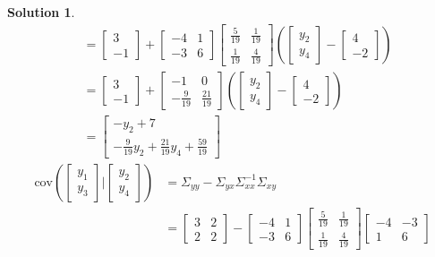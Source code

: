 \documentclass[11pt]{article}
\newtheorem{sol}{Solution}
\begin{document}
\begin{sol}
\begin{align*}
		&= \left[\begin{array}{c} 3\\ -1\end{array}\right] + \left[\begin{array}{cc} -4& 1\\ -3&6 \end{array}\right]\left[\begin{array}{cc}\frac{5}{19} & \frac{1}{19}\\ \frac{1}{19}& \frac{4}{19}\end{array}\right](\left[\begin{array}{c} y_2\\ y_4\end{array}\right] - \left[\begin{array}{c} 4\\ -2\end{array}\right])\\
		&= \left[\begin{array}{c} 3\\ -1\end{array}\right] + \left[\begin{array}{cc}-1&0 \\ -\frac{9}{19}&\frac{21}{19}  \end{array}\right](\left[\begin{array}{c} y_2\\ y_4\end{array}\right] - \left[\begin{array}{c} 4\\ -2\end{array}\right])\\
		&= \left[\begin{array}{c} -y_2 + 7\\ -\frac{9}{19}y_2 + \frac{21}{19}y_4 + \frac{59}{19}\end{array}\right]
	\end{align*}	
	\begin{align*}
		\text{cov}(\left[\begin{array}{c} y_1\\ y_3\end{array}\right]|\left[\begin{array}{c} y_2\\ y_4\end{array}\right]) &= \Sigma_{yy} - \Sigma_{yx}\Sigma_{xx}^{-1}\Sigma_{xy}\\
		&=  \left[\begin{array}{cc} 3&2 \\ 2& 2\end{array}\right] -  \left[\begin{array}{cc} -4& 1\\ -3&6 \end{array}\right]\left[\begin{array}{cc}\frac{5}{19} & \frac{1}{19}\\ \frac{1}{19}& \frac{4}{19}\end{array}\right] \left[\begin{array}{cc}-4 &-3 \\ 1& 6\end{array}\right]\\

\end{align*}
\end{sol}
\end{document}
